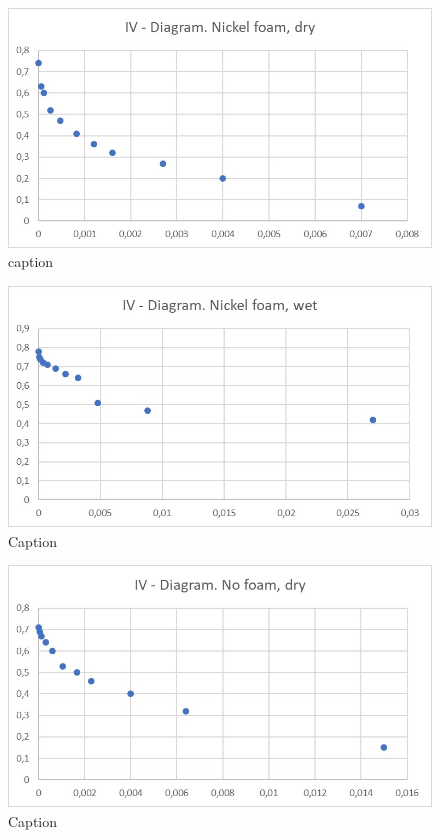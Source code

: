 

\begin{figure}[ht]
    \centering
    \includegraphics[width=\textwidth]{DIV./Bilder/IVcurveNFD.jpg}
    \caption{caption}
    \label{fig:IVcurveNFD}
\end{figure}

\begin{figure}[ht]
    \centering
    \includegraphics[width=\textwidth]{DIV./Bilder/IVcurveNFW.jpg}
    \caption{Caption}
    \label{fig:IVcurveNFW}
\end{figure}

\begin{figure}[ht]
    \centering
    \includegraphics[width=\textwidth]{DIV./Bilder/IVcurveD.jpg}
    \caption{Caption}
    \label{fig:IVcurveD}
\end{figure}

